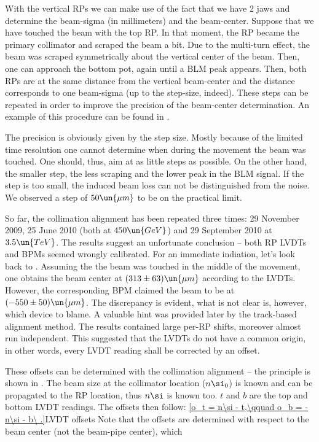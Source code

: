 With the vertical RPs we can make use of the fact that we have 2 jaws and determine the beam-sigma (in millimeters) and the beam-center. Suppose that we have touched the beam with the top RP. In that moment, the RP became the primary collimator and scraped the beam a bit. Due to the multi-turn effect, the beam was scraped symmetrically about the vertical center of the beam. Then, one can approach the bottom pot, again until a BLM peak appears. Then, both RPs are at the same distance from the vertical beam-center and the distance corresponds to one beam-sigma (up to the step-size, indeed). These steps can be repeated in order to improve the precision of the beam-center determination. An example of this procedure can be found in .


The precision is obviously given by the step size. Mostly because of the limited time resolution one cannot determine when during the movement the beam was touched. One should, thus, aim at as little steps as possible. On the other hand, the smaller step, the less scraping and the lower peak in the BLM signal. If the step is too small, the induced beam loss can not be distinguished from the noise. We observed a step of $50\un{\mu m}$ to be on the practical limit.

So far, the collimation alignment has been repeated three times: 29 November 2009, 25 June 2010 (both at $450\un{GeV}$) and 29 September 2010 at $3.5\un{TeV}$. The results suggest an unfortunate conclusion -- both RP LVDTs and BPMs seemed wrongly calibrated. For an immediate indiation, let's look back to . Assuming the the beam was touched in the middle of the movement, one obtains the beam center at $(313\pm 63)\un{\mu m}$ according to the LVDTs. However, the corresponding BPM claimed the beam to be at $(-550\pm50)\un{\mu m}$. The discrepancy is evident, what is not clear is, however, which device to blame. A valuable hint was provided later by the track-based alignment method. The results contained large per-RP shifts, moreover almost run independent. This suggested that the LVDTs do not have a common origin, in other words, every LVDT reading shall be corrected by an offset. 

These offsets can be determined with the collimation alignment -- the principle is shown in . The beam size at the collimator location ($n\si_0$) is known and can be propagated to the RP location, thus $n\si$ is known too. $t$ and $b$ are the top and bottom LVDT readings. The offsets then follow:
\eqref{o_t = n\si - t,\qquad o_b = -n\si - b\ .}{LVDT offsets}
Note that the offsets are determined with respect to the beam center (not the beam-pipe center), which 


